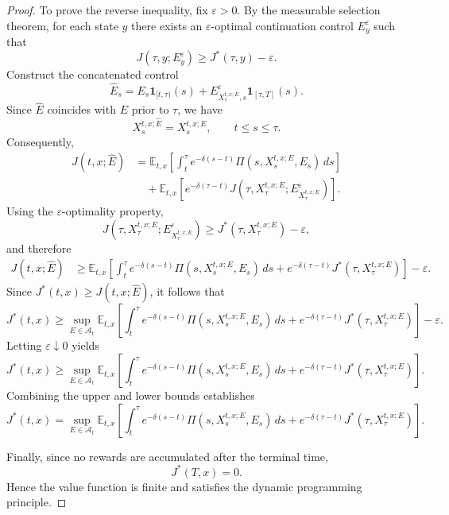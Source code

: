 \documentclass[11pt]{article}
\begin{document}
\begin{proof}
		To prove the reverse inequality, fix $\varepsilon>0$. By the measurable selection theorem, for each state $y$ there exists an $\varepsilon$-optimal continuation control $E_y^\varepsilon$ such that
		\[
		J(\tau,y;E_y^\varepsilon)
		\ge
		J^*(\tau,y)-\varepsilon.
		\]
		Construct the concatenated control
		\[
		\widehat E_s
		=
		E_s\mathbf 1_{[t,\tau)}(s)
		+
		E^\varepsilon_{X_\tau^{t,x;E},s}
		\mathbf 1_{[\tau,T]}(s).
		\]
		Since $\widehat E$ coincides with $E$ prior to $\tau$, we have
		\[
		X_s^{t,x;\widehat E}
		=
		X_s^{t,x;E},
		\qquad
		t\le s\le\tau.
		\]
		Consequently,
		\[
		\begin{aligned}
			J(t,x;\widehat E)
			&=
			\mathbb{E}_{t,x}
			\left[
			\int_t^\tau
			e^{-\delta(s-t)}
			\Pi(s,X_s^{t,x;E},E_s)\,ds
			\right]
			\\
			&\quad
			+
			\mathbb{E}_{t,x}
			\left[
			e^{-\delta(\tau-t)}
			J(\tau,X_\tau^{t,x;E};E^\varepsilon_{X_\tau^{t,x;E}})
			\right].
		\end{aligned}
		\]
		Using the $\varepsilon$-optimality property,
		\[
		J(\tau,X_\tau^{t,x;E};E^\varepsilon_{X_\tau^{t,x;E}})
		\ge
		J^*(\tau,X_\tau^{t,x;E})
		-\varepsilon,
		\]
		and therefore
		\[
		\begin{aligned}
			J(t,x;\widehat E)
			&\ge
			\mathbb{E}_{t,x}
			\left[
			\int_t^\tau
			e^{-\delta(s-t)}
			\Pi(s,X_s^{t,x;E},E_s)\,ds
			+
			e^{-\delta(\tau-t)}
			J^*(\tau,X_\tau^{t,x;E})
			\right]
			-\varepsilon.
		\end{aligned}
		\]
		Since $J^*(t,x)\ge J(t,x;\widehat E)$, it follows that
		\[
		J^*(t,x)
		\ge
		\sup_{E\in\mathcal{A}_t}
		\mathbb{E}_{t,x}
		\left[
		\int_t^\tau
		e^{-\delta(s-t)}
		\Pi(s,X_s^{t,x;E},E_s)\,ds
		+
		e^{-\delta(\tau-t)}
		J^*(\tau,X_\tau^{t,x;E})
		\right]
		-\varepsilon.
		\]
		Letting $\varepsilon\downarrow0$ yields
		\[
		J^*(t,x)
		\ge
		\sup_{E\in\mathcal{A}_t}
		\mathbb{E}_{t,x}
		\left[
		\int_t^\tau
		e^{-\delta(s-t)}
		\Pi(s,X_s^{t,x;E},E_s)\,ds
		+
		e^{-\delta(\tau-t)}
		J^*(\tau,X_\tau^{t,x;E})
		\right].
		\]
		Combining the upper and lower bounds establishes
		\[
		J^*(t,x)
		=
		\sup_{E\in\mathcal{A}_t}
		\mathbb{E}_{t,x}
		\left[
		\int_t^\tau
		e^{-\delta(s-t)}
		\Pi(s,X_s^{t,x;E},E_s)\,ds
		+
		e^{-\delta(\tau-t)}
		J^*(\tau,X_\tau^{t,x;E})
		\right].
		\]
		
		Finally, since no rewards are accumulated after the terminal time,
		\[
		J^*(T,x)=0.
		\]
		Hence the value function is finite and satisfies the dynamic programming principle. 
	\end{proof}
	
\end{document}
